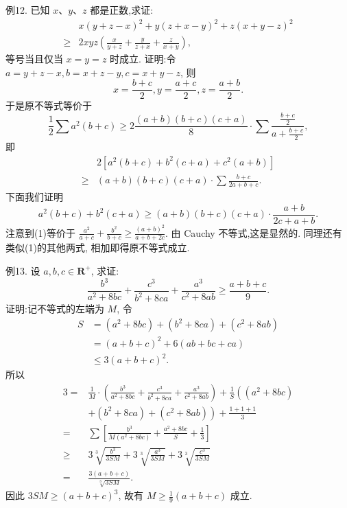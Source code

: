 例12. 已知 $x 、 y 、 z$ 都是正数,求证:
$$
\begin{aligned}
& x(y+z-x)^2+y(z+x-y)^2+z(x+y-z)^2 \\
\geqslant & 2 x y z\left(\frac{x}{y+z}+\frac{y}{z+x}+\frac{z}{x+y}\right),
\end{aligned}
$$
等号当且仅当 $x=y=z$ 时成立.
证明:令 $a=y+z-x, b=x+z-y, c=x+y-z$, 则
$$
x=\frac{b+c}{2}, y=\frac{a+c}{2}, z=\frac{a+b}{2} .
$$
于是原不等式等价于
$$
\frac{1}{2} \sum a^2(b+c) \geqslant 2 \frac{(a+b)(b+c)(c+a)}{8} \cdot \sum \frac{\frac{b+c}{2}}{a+\frac{b+c}{2}},
$$
即
$$
\begin{aligned}
& 2\left[a^2(b+c)+b^2(c+a)+c^2(a+b)\right] \\
\geqslant & (a+b)(b+c)(c+a) \cdot \sum \frac{b+c}{2 a+b+c} .
\end{aligned}
$$
下面我们证明
$$
a^2(b+c)+b^2(c+a) \geqslant(a+b)(b+c)(c+a) \cdot \frac{a+b}{2 c+a+b} . \label{(1)}
$$
注意到(1)等价于 $\frac{a^2}{a+c}+\frac{b^2}{b+c} \geqslant \frac{(a+b)^2}{a+b+2 c}$.
由 Cauchy 不等式,这是显然的.
同理还有类似(1)的其他两式, 相加即得原不等式成立.



例13. 设 $a, b, c \in \mathbf{R}^{+}$, 求证:
$$
\frac{b^3}{a^2+8 b c}+\frac{c^3}{b^2+8 c a}+\frac{a^3}{c^2+8 a b} \geqslant \frac{a+b+c}{9} .
$$
证明:记不等式的左端为 $M$, 令
$$
\begin{aligned}
S & =\left(a^2+8 b c\right)+\left(b^2+8 c a\right)+\left(c^2+8 a b\right) \\
& =(a+b+c)^2+6(a b+b c+c a) \\
& \leqslant 3(a+b+c)^2 .
\end{aligned}
$$
所以
$$
\begin{aligned}
3= & \frac{1}{M} \cdot\left(\frac{b^3}{a^2+8 b c}+\frac{c^3}{b^2+8 c a}+\frac{a^3}{c^2+8 a b}\right)+\frac{1}{S}\left(\left(a^2+8 b c\right)\right. \\
& \left.+\left(b^2+8 c a\right)+\left(c^2+8 a b\right)\right)+\frac{1+1+1}{3} \\
= & \sum\left[\frac{b^3}{M\left(a^2+8 b c\right)}+\frac{a^2+8 b c}{S}+\frac{1}{3}\right] \\
\geqslant & 3 \sqrt[3]{\frac{b^3}{3 S M}}+3 \sqrt[3]{\frac{a^3}{3 S M}}+3 \sqrt[3]{\frac{c^3}{3 S M}} \\
= & \frac{3(a+b+c)}{\sqrt[3]{3 S M}} .
\end{aligned}
$$
因此 $3 S M \geqslant(a+b+c)^3$, 故有 $M \geqslant \frac{1}{9}(a+b+c)$ 成立.



